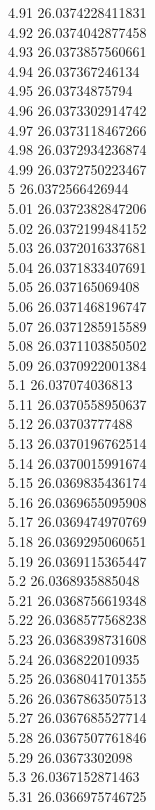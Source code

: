 {4.91	26.0374228411831\\
4.92	26.0374042877458\\
4.93	26.0373857560661\\
4.94	26.037367246134\\
4.95	26.03734875794\\
4.96	26.0373302914742\\
4.97	26.0373118467266\\
4.98	26.0372934236874\\
4.99	26.0372750223467\\
5	26.0372566426944\\
5.01	26.0372382847206\\
5.02	26.0372199484152\\
5.03	26.0372016337681\\
5.04	26.0371833407691\\
5.05	26.037165069408\\
5.06	26.0371468196747\\
5.07	26.0371285915589\\
5.08	26.0371103850502\\
5.09	26.0370922001384\\
5.1	26.037074036813\\
5.11	26.0370558950637\\
5.12	26.03703777488\\
5.13	26.0370196762514\\
5.14	26.0370015991674\\
5.15	26.0369835436174\\
5.16	26.0369655095908\\
5.17	26.0369474970769\\
5.18	26.0369295060651\\
5.19	26.0369115365447\\
5.2	26.0368935885048\\
5.21	26.0368756619348\\
5.22	26.0368577568238\\
5.23	26.0368398731608\\
5.24	26.036822010935\\
5.25	26.0368041701355\\
5.26	26.0367863507513\\
5.27	26.0367685527714\\
5.28	26.0367507761846\\
5.29	26.03673302098\\
5.3	26.0367152871463\\
5.31	26.0366975746725\\
}
